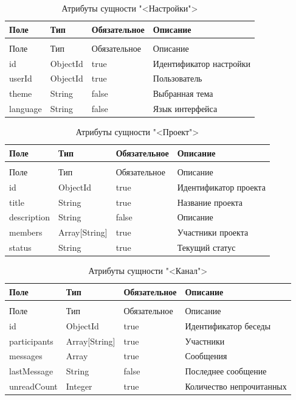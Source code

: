 \begin{xltabular}{\textwidth}{|l|l|p{3.2cm}|X|}
  \caption{Атрибуты сущности "<Настройки">\label{settings:table}}\\ \hline
  Поле & Тип & Обязательное & Описание \\ \hline
  \endfirsthead
  \\ \hline
  Поле & Тип & Обязательное & Описание \\ \hline
  \endhead
  id & ObjectId & true & Идентификатор настройки \\ \hline
  userId & ObjectId & true & Пользователь \\ \hline
  theme & String & false & Выбранная тема \\ \hline
  language & String & false & Язык интерфейса \\ \hline
\end{xltabular}

\begin{xltabular}{\textwidth}{|l|l|p{3.2cm}|X|}
  \caption{Атрибуты сущности "<Проект">\label{projects:table}}\\ \hline
  Поле & Тип & Обязательное & Описание \\ \hline
  \endfirsthead
  \\ \hline
  Поле & Тип & Обязательное & Описание \\ \hline
  \endhead
  id & ObjectId & true & Идентификатор проекта \\ \hline
  title & String & true & Название проекта \\ \hline
  description & String & false & Описание \\ \hline
  members & Array[String] & true & Участники проекта \\ \hline
  status & String & true & Текущий статус \\ \hline
\end{xltabular}

\begin{xltabular}{\textwidth}{|l|l|p{3.2cm}|X|}
  \caption{Атрибуты сущности "<Канал">\label{talks:table}}\\ \hline
  Поле & Тип & Обязательное & Описание \\ \hline
  \endfirsthead
  \\ \hline
  Поле & Тип & Обязательное & Описание \\ \hline
  \endhead
  id & ObjectId & true & Идентификатор беседы \\ \hline
  participants & Array[String] & true & Участники \\ \hline
  messages & Array & true & Сообщения \\ \hline
  lastMessage & String & false & Последнее сообщение \\ \hline
  unreadCount & Integer & true & Количество непрочитанных \\ \hline
\end{xltabular}

